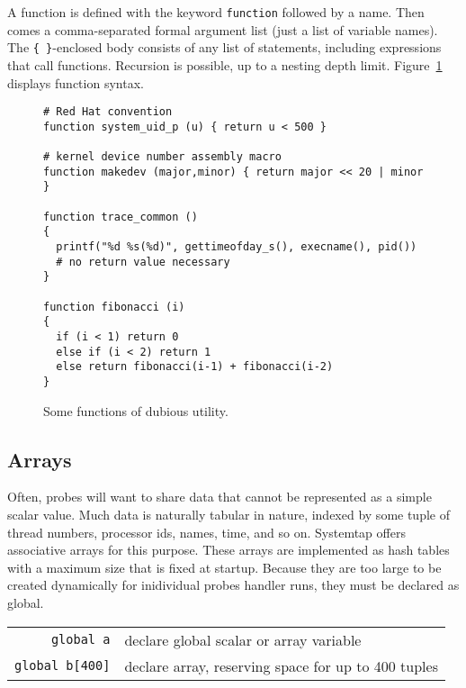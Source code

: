 \documentclass{article}
\newenvironment{boxedminipage}%
    {\begin{makeimage}\begin{center}\begin{Sbox}\begin{minipage}}%
    {\end{minipage}\end{Sbox}\fbox{\TheSbox}\end{center}\end{makeimage}}
\renewcommand{\nomenclature}[2]{}
\begin{document}
A function is defined with the keyword \verb+function+ followed by a
name.  Then comes a comma-separated formal argument list (just a list
of variable names).  The \verb+{ }+-enclosed body consists of any list
of statements, including expressions that call functions.  Recursion
is possible, up to a nesting depth limit.  Figure~\ref{fig:functions}
displays function syntax.


\begin{figure}[!ht]
\begin{boxedminipage}{4.5in}
\begin{verbatim}
# Red Hat convention
function system_uid_p (u) { return u < 500 }

# kernel device number assembly macro
function makedev (major,minor) { return major << 20 | minor }

function trace_common ()
{
  printf("%d %s(%d)", gettimeofday_s(), execname(), pid())
  # no return value necessary
} 

function fibonacci (i)
{
  if (i < 1) return 0
  else if (i < 2) return 1
  else return fibonacci(i-1) + fibonacci(i-2)
}
\end{verbatim}
\end{boxedminipage}
\caption{Some functions of dubious utility.}
\label{fig:functions}
\end{figure}

\subsection{Arrays}

Often, probes will want to share data that cannot be represented as a
simple scalar value.  Much data is naturally tabular in nature,
indexed by some tuple of thread numbers, processor ids, names, time,
and so on.  Systemtap offers associative arrays for this purpose.
These arrays are implemented as hash tables with a maximum size that
is fixed at startup.  Because they are too large to be created
dynamically for inidividual probes handler runs, they must be declared
as global.  \nomenclature{array}{A global
\verb+[+$k_1,k_2,\ldots,k_n\verb+]+\rightarrow value$
associative lookup table, with a string,
number for each index; the value may be a string, number, or an aggregate.}

\begin{tabular}{rl}
\verb|global a| & declare global scalar or array variable \\
\verb|global b[400]| & declare array, reserving space for up to 400 tuples \\
\end{tabular}
\end{document}
